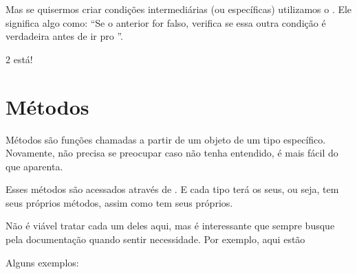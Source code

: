 \documentclass[letterpaper,10pt,english]{jupyterBook}
\begin{document}
\sphinxAtStartPar
Mas se quisermos criar condições intermediárias (ou específicas) utilizamos o . Ele significa algo como: “Se o anterior for falso, verifica se essa outra condição é verdadeira antes de ir pro ”.

\begin{sphinxVerbatim}[commandchars=\\\{\}]
  \PYG{p}{[}\PYG{p}{]}

   
     
   
\end{sphinxVerbatim}

\begin{sphinxVerbatim}[commandchars=\\\{\}]
2 está!
\end{sphinxVerbatim}


\section{Métodos}
\label{\detokenize{chapters/2:metodos}}
\sphinxAtStartPar
Métodos são funções chamadas a partir de um objeto de um tipo específico. Novamente, não precisa se preocupar caso não tenha entendido, é mais fácil do que aparenta.

\sphinxAtStartPar
Esses métodos são acessados através de . E cada tipo terá os seus, ou seja,  tem seus próprios métodos, assim como  tem seus próprios.

\sphinxAtStartPar
Não é viável tratar cada um deles aqui, mas é interessante que sempre busque pela documentação quando sentir necessidade. Por exemplo, aqui estão 

\sphinxAtStartPar
Alguns exemplos:
\end{document}

